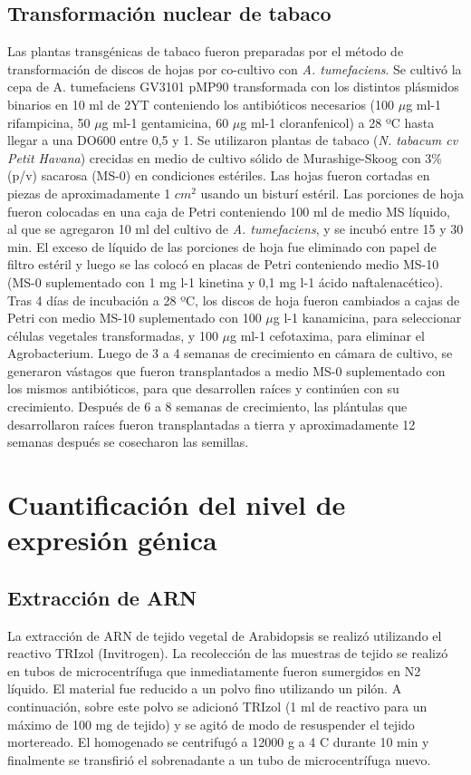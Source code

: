 \subsection{Transformación nuclear de tabaco}
Las plantas transgénicas de tabaco fueron preparadas por el método de transformación de discos de hojas por co-cultivo con \textit{A. tumefaciens}.
Se cultivó la cepa de A. tumefaciens GV3101 pMP90 transformada con los distintos plásmidos binarios en 10 ml de 2YT conteniendo los antibióticos necesarios (100 $\mu$g ml-1 rifampicina, 50 $\mu$g ml-1 gentamicina, 60 $\mu$g ml-1 cloranfenicol) a 28 ºC hasta llegar a una DO600 entre 0,5 y 1.
Se utilizaron plantas de tabaco (\textit{N. tabacum cv Petit Havana}) crecidas en medio de cultivo sólido de Murashige-Skoog con 3\% (p/v) sacarosa (MS-0) en condiciones estériles.
Las hojas fueron cortadas en piezas de aproximadamente 1 $cm^2$ usando un bisturí estéril.
Las porciones de hoja fueron colocadas en una caja de Petri conteniendo 100 ml de medio MS líquido, al que se agregaron 10 ml del cultivo de \textit{A. tumefaciens}, y se incubó entre 15 y 30 min.
El exceso de líquido de las porciones de hoja fue eliminado con papel de filtro estéril y luego se las colocó en placas de Petri conteniendo medio MS-10 (MS-0 suplementado con 1 mg l-1 kinetina y 0,1 mg l-1 ácido naftalenacético).
Tras 4 días de incubación a 28 ºC, los discos de hoja fueron cambiados a cajas de Petri con medio MS-10 suplementado con 100 $\mu$g l-1 kanamicina, para seleccionar células vegetales transformadas, y 100 $\mu$g ml-1 cefotaxima, para eliminar el Agrobacterium.
Luego de 3 a 4 semanas de crecimiento en cámara de cultivo, se generaron vástagos que fueron transplantados a medio MS-0 suplementado con los mismos antibióticos, para que desarrollen raíces y continúen con su crecimiento.
Después de 6 a 8 semanas de crecimiento, las plántulas que desarrollaron raíces fueron transplantadas a tierra y aproximadamente 12 semanas después se cosecharon las semillas.

\section{Cuantificación del nivel de expresión génica}

\subsection{Extracción de ARN}
\label{sec:extraccion_ARN}
La extracción de ARN de tejido vegetal de Arabidopsis se realizó utilizando el reactivo TRIzol (Invitrogen).
La recolección de las muestras de tejido se realizó en tubos de microcentrífuga que inmediatamente fueron sumergidos en N2 líquido.
El material fue reducido a un polvo fino utilizando un pilón. A continuación, sobre este polvo se adicionó TRIzol (1 ml de reactivo para un máximo de 100 mg de tejido) y se agitó de modo de resuspender el tejido mortereado.
El homogenado se centrifugó a 12000 g a 4 \degree C durante 10 min y finalmente se transfirió el sobrenadante a un tubo de microcentrífuga nuevo.

